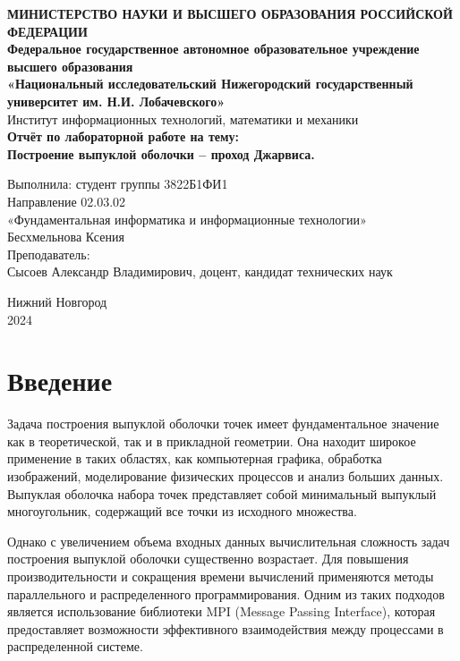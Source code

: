 \documentclass[a4paper,12pt]{article}
\begin{document}
\begin{titlepage}
\begin{center}
\textbf{МИНИСТЕРСТВО НАУКИ И ВЫСШЕГО ОБРАЗОВАНИЯ РОССИЙСКОЙ ФЕДЕРАЦИИ} \\[0.5cm]
\textbf{Федеральное государственное автономное образовательное учреждение высшего образования} \\[0.5cm]
\textbf{«Национальный исследовательский Нижегородский государственный университет им. Н.И. Лобачевского»} \\[0.5cm]
Институт информационных технологий, математики и механики \\
\vfill
{\Large
\textbf{Отчёт по лабораторной работе на тему:} \\[0.5cm]
\textbf{Построение выпуклой оболочки – проход Джарвиса.} \\
}
\vfill
\begin{flushright}
Выполнила: студент группы 3822Б1ФИ1 \\
Направление 02.03.02 \\
«Фундаментальная информатика и информационные технологии» \\
Бесхмельнова Ксения \\
\vspace{1cm}
Преподаватель: \\
Сысоев Александр Владимирович, доцент, кандидат технических наук \\
\end{flushright}
\vfill
Нижний Новгород \\
2024
\end{center}
\end{titlepage}

\tableofcontents
\newpage

\section{Введение}
Задача построения выпуклой оболочки точек имеет фундаментальное значение как в теоретической, так и в прикладной геометрии. Она находит широкое применение в таких областях, как компьютерная графика, обработка изображений, моделирование физических процессов и анализ больших данных. Выпуклая оболочка набора точек представляет собой минимальный выпуклый многоугольник, содержащий все точки из исходного множества.

Однако с увеличением объема входных данных вычислительная сложность задач построения выпуклой оболочки существенно возрастает. Для повышения производительности и сокращения времени вычислений применяются методы параллельного и распределенного программирования. Одним из таких подходов является использование библиотеки MPI (Message Passing Interface), которая предоставляет возможности эффективного взаимодействия между процессами в распределенной системе.
\end{document}

